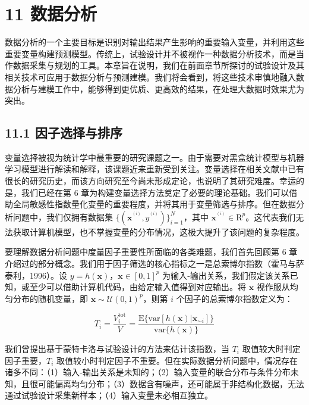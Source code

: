 \documentclass{ctexart}
\begin{document}
\section*{11 数据分析}

数据分析的一个主要目标是识别对输出结果产生影响的重要输入变量，并利用这些重要变量构建预测模型。传统上，试验设计并不被视作一种数据分析技术，而是当作数据采集与规划的工具。本章旨在说明，我们在前面章节所探讨的试验设计及其相关技术可应用于数据分析与预测建模。我们将会看到，将这些技术审慎地融入数据分析与建模工作中，能够得到更优质、更高效的结果，在处理大数据时效果尤为突出。

\subsection*{11.1 因子选择与排序}

变量选择被视为统计学中最重要的研究课题之一。由于需要对黑盒统计模型与机器学习模型进行解读和解释，该课题近来重新受到关注。变量选择在相关文献中已有很长的研究历史，而该方向研究至今尚未形成定论，也说明了其研究难度。幸运的是，我们已经在第 6 章为构建变量选择方法奠定了必要的理论基础。我们可以借助全局敏感性指数量化变量的重要程度，并将其用于变量筛选与排序。但在数据分析问题中，我们仅拥有数据集 $\{(\boldsymbol{x}^{^{(i)}}, y^{^{(i)}})\}_{i=1}^N$，其中 $\boldsymbol{x}^{^{(i)}}\in\mathrm{R}^p$。这代表我们无法获取计算机模型，也不掌握变量的分布情况，这极大提升了该问题的复杂程度。

要理解数据分析问题中度量因子重要性所面临的各类难题，我们首先回顾第 6 章介绍过的部分概念。我们用于因子筛选的核心指标之一是总索博尔指数（霍马与萨泰利，1996）。设 $y=h(\boldsymbol{x})$，$\boldsymbol{x}\in[0,1]^p$ 为输入‑输出关系，我们假定该关系已知，或至少可以借助计算机代码，由给定输入值得到对应输出。将 $\boldsymbol{x}$ 视作服从均匀分布的随机变量，即 $\boldsymbol{x}\sim\mathcal{U}(0,1)^p$，则第 $i$ 个因子的总索博尔指数定义为：

\begin{equation*}
T_i=\frac{V_i^{\mathrm{tot}}}{V}=\frac{\mathrm{E}\{\mathrm{var}[h(\boldsymbol{x})|\boldsymbol{x}_{\sim i}]\}}{\mathrm{var}\{h(\boldsymbol{x})\}}
\tag{11.1}
\end{equation*}

我们曾提出基于蒙特卡洛与试验设计的方法来估计该指数，当 $T_i$ 取值较大时判定因子重要，$T_i$ 取值较小时判定因子不重要。但在实际数据分析问题中，情况存在诸多不同：（1）输入‑输出关系是未知的；（2）输入变量的联合分布与条件分布未知，且很可能偏离均匀分布；（3）数据含有噪声，还可能属于非结构化数据，无法通过试验设计采集新样本；（4）输入变量未必相互独立。
\end{document}
